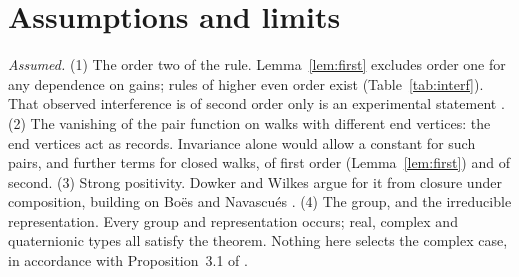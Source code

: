 \section{Assumptions and limits}\label{sec:limits}

\emph{Assumed.} (1) The order two of the rule. Lemma~\ref{lem:first} excludes order one for any dependence on gains; rules of higher even order exist (Table~\ref{tab:interf}). That observed interference is of second order only is an experimental statement \cite{sinha}. (2) The vanishing of the pair function on walks with different end vertices: the end vertices act as records. Invariance alone would allow a constant for such pairs, and further terms for closed walks, of first order (Lemma~\ref{lem:first}) and of second. (3) Strong positivity. Dowker and Wilkes argue for it from closure under composition, building on Bo\"es and Navascu\'es \cite{dw,bn}. (4) The group, and the irreducible representation. Every group and representation occurs; real, complex and quaternionic types all satisfy the theorem. Nothing here selects the complex case, in accordance with Proposition~3.1 of \cite{g7}.

